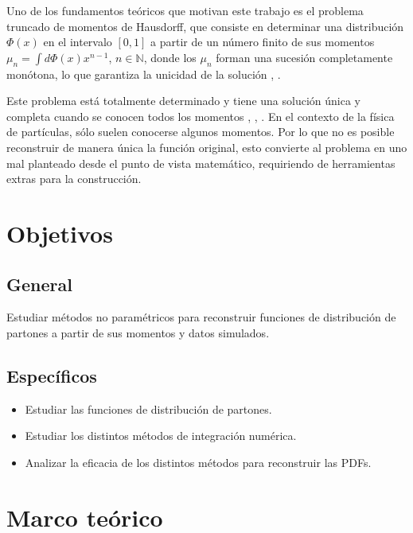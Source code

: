 \documentclass[titlepage,11pt]{report}
\begin{document}
Uno de los fundamentos teóricos que motivan este trabajo es el problema truncado de momentos de Hausdorff, que consiste en determinar una distribución $\Phi(x)$ en el intervalo $[0,1]$ a partir de un número finito de sus momentos $\mu_n=\int d\Phi(x) x^{n-1}$, $n\in \mathbb{N}$, donde los $\mu_n$ forman una sucesión completamente monótona, lo que garantiza la unicidad de la solución \cite{Lopez2025}, \cite{garciaproblema}.

Este problema está totalmente determinado y tiene una solución única y completa cuando se conocen todos los momentos \cite{athanassoulis2002truncated}, \cite{gzyl2010hausdorff}, \cite{tagliani2011hausdorff}. En el contexto de la física de partículas, sólo suelen conocerse algunos momentos. Por lo que no es posible reconstruir de manera única la función original, esto convierte al problema en uno mal planteado desde el punto de vista matemático, requiriendo de herramientas extras para la construcción.

\chapter{Objetivos}
\label{sec:objetivos}
\section{General}
\label{sec:general}

Estudiar métodos no paramétricos para reconstruir funciones de distribución de partones a partir de sus momentos y datos simulados.

\section{Específicos}
\label{sec:especificos}

\begin{itemize}
    \item Estudiar las funciones de distribución de partones.

    \item Estudiar los distintos métodos de integración numérica.

    \item Analizar la eficacia de los distintos métodos para reconstruir las PDFs.
\end{itemize}


\chapter{Marco teórico}
\label{sec:marco}
\end{document}
